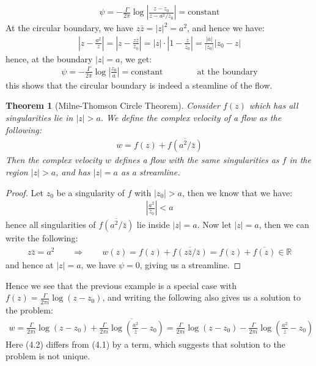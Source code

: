 \documentclass[11pt]{book}
\theoremstyle{break}
\theoremstyle{break}
\newtheorem{thm}{Theorem}[section]
\newcommand{\R}{\mathbb{R}}
\begin{document}
\begin{align*}
\psi = -\frac{\Gamma}{2\pi}\log\left|\frac{z-z_0}{z-a^2/z_0}\right| = \text{constant}
\end{align*}
At the circular boundary, we have $z\bar{z} = |z|^2 = a^2$, and hence we have:
\begin{align*}
\left|z - \frac{a^2}{z}\right| = \left|z - \frac{z\bar{z}}{z_0}\right| = |z| \cdot \left|1 - \frac{\bar{z}}{\bar{z}_0}\right| = \frac{|a|}{|z_0|}\left|z_0 - z\right|
\end{align*}
hence, at the boundary $|z| = a$, we get:
\begin{align*}
\psi = -\frac{\Gamma}{2\pi}\log\left| \frac{z_0}{a}\right| = \text{constant} \qquad \qquad \text{at the boundary}
\end{align*}
this shows that the circular boundary is indeed a steamline of the flow. \\



\begin{thm}[Milne-Thomson Circle Theorem]
Consider $f(z)$ which has all singularities lie in $|z| >a$. We define the complex velocity of a flow as the following:
\begin{align*}
w = f(z) + \overline{f\left(a^2 / \bar{z}\right)}
\end{align*}
Then the complex velocity $w$ defines a flow with the same singularities as $f$ in the region $|z|>a$, and has $|z| = a$ as a streamline. 
\end{thm}
\begin{proof}
Let $z_0$ be a singularity of $f$ with $|z_0|>a$, then we know that we have:
\begin{align*}
\left| \frac{a^2}{\bar{z}_0}\right| < a
\end{align*}
hence all singularities of $\overline{f(a^2/\bar{z})}$ lie inside $|z| = a$. Now let $|z| = a$, then we can write the following:
\begin{align*}
z\bar{z} = a^2 \qquad \Rightarrow \qquad w(z) = f(z) + \overline{f(z\bar{z}/\bar{z})} = f(z) + \overline{f(z)} \in \R
\end{align*} 
and hence at $|z| = a$, we have $\psi=0$, giving us a streamline. 
\end{proof}


Hence we see that the previous example is a special case with $f(z) = \frac{\Gamma}{2\pi i}\log(z-z_0)$, and writing the following also gives us a solution to the problem:
\begin{align}
w = \frac{\Gamma}{2\pi i}\log(z-z_0) + \overline{ \frac{\Gamma}{2\pi i}\log\left( \frac{a^2}{\bar{z}} - z_0\right) } = \frac{\Gamma}{2\pi i}\log(z-z_0) - \frac{\Gamma}{2\pi i}\log\left( \frac{a^2}{\bar{z}} - z_0\right) 
\end{align}
Here (4.2) differs from (4.1) by a term, which suggests that solution to the problem is not unique. 
\end{document}
